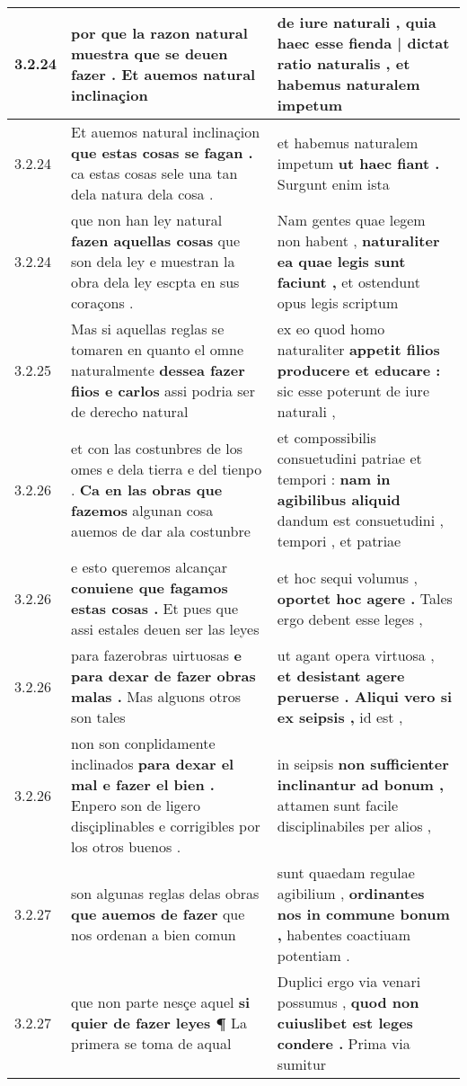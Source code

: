 \begin{tabular}{|p{1cm}|p{6.5cm}|p{6.5cm}|}
3.2.24 & por que la razon natural muestra \textbf{ que se deuen fazer . } Et auemos natural inclinaçion & de iure naturali , \textbf{ quia haec esse fienda | dictat ratio naturalis , } et habemus naturalem impetum \\\hline
3.2.24 & Et auemos natural inclinaçion \textbf{ que estas cosas se fagan . } ca estas cosas sele una tan dela natura dela cosa . & et habemus naturalem impetum \textbf{ ut haec fiant . } Surgunt enim ista \\\hline
3.2.24 & que non han ley natural \textbf{ fazen aquellas cosas } que son dela ley e muestran la obra dela ley escpta en sus coraçons . & Nam gentes quae legem non habent , \textbf{ naturaliter ea quae legis sunt faciunt , } et ostendunt opus legis scriptum \\\hline
3.2.25 & Mas si aquellas reglas se tomaren en quanto el omne naturalmente \textbf{ dessea fazer fiios e carlos } assi podria ser de derecho natural & ex eo quod homo naturaliter \textbf{ appetit filios producere et educare : } sic esse poterunt de iure naturali , \\\hline
3.2.26 & et con las costunbres de los omes e dela tierra e del tienpo . \textbf{ Ca en las obras que fazemos } algunan cosa auemos de dar ala costunbre & et compossibilis consuetudini patriae et tempori : \textbf{ nam in agibilibus aliquid } dandum est consuetudini , tempori , et patriae \\\hline
3.2.26 & e esto queremos alcançar \textbf{ conuiene que fagamos estas cosas . } Et pues que assi estales deuen ser las leyes & et hoc sequi volumus , \textbf{ oportet hoc agere . } Tales ergo debent esse leges , \\\hline
3.2.26 & para fazerobras uirtuosas \textbf{ e para dexar de fazer obras malas . } Mas alguons otros son tales & ut agant opera virtuosa , \textbf{ et desistant agere peruerse . Aliqui vero si ex seipsis , } id est , \\\hline
3.2.26 & non son conplidamente inclinados \textbf{ para dexar el mal e fazer el bien . } Enpero son de ligero disçiplinables e corrigibles por los otros buenos . & in seipsis \textbf{ non sufficienter inclinantur ad bonum , } attamen sunt facile disciplinabiles per alios , \\\hline
3.2.27 & son algunas reglas delas obras \textbf{ que auemos de fazer } que nos ordenan a bien comun & sunt quaedam regulae agibilium , \textbf{ ordinantes nos in commune bonum , } habentes coactiuam potentiam . \\\hline
3.2.27 & que non parte nesçe aquel \textbf{ si quier de fazer leyes ¶ } La primera se toma de aqual & Duplici ergo via venari possumus , \textbf{ quod non cuiuslibet est leges condere . } Prima via sumitur \\\hline

\end{tabular}

